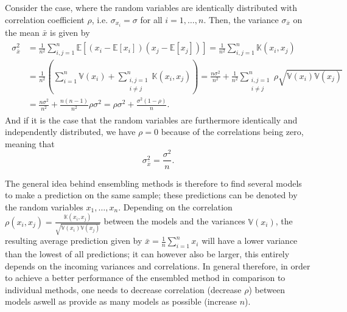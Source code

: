 \documentclass[a4paper,11pt]{article}
\numberwithin{equation}{section}
\begin{document}
{Consider the case, where the random variables are identically distributed with correlation coefficient $\rho$, i.e. $\sigma_{x_i} = \sigma$ for all $i=1,\dots,n$. Then, the variance $\sigma_{\bar{x}}$ on the mean $\bar{x}$ is given by \begin{align}\begin{aligned}
	\sigma_{\bar{x}}^2 &=\frac{1}{n^2}\sum_{i,j=1}^{n}\mathbb{E}\left[(x_i-\mathbb{E}[x_i])(x_j-\mathbb{E}[x_j])\right] = \frac{1}{n^2}\sum_{i,j=1}^{n}\mathbb{K}(x_i,x_j) \\ &= \frac{1}{n^2}\left(\sum_{i=1}^{n}\mathbb{V}(x_i)+\sum_{\substack{i,j=1 \\ i\neq j}}^{n}\mathbb{K}(x_i,x_j)\right) = \frac{n\sigma^2}{n^2}+ \frac{1}{n^2}\sum_{\substack{i,j=1 \\ i\neq j}}^{n}\rho \sqrt{\mathbb{V}(x_i)\mathbb{V}(x_j)} \\ &= \frac{n\sigma^2}{n^2} + \frac{n(n-1)}{n^2}\rho\sigma^2 = \rho\sigma^2 + \frac{\sigma^2(1-\rho)}{n}.
\end{aligned}\end{align} And if it is the case that the random variables are furthermore identically and independently distributed, we have $\rho=0$ because of the correlations being zero, meaning that \begin{equation}
\sigma_{\bar{x}}^2 = \frac{\sigma^2}{n}.
\end{equation}

The general idea behind ensembling methods is therefore to find several models to make a prediction on the same sample; these predictions can be denoted by the random variables $x_1,\dots,x_n$. Depending on the correlation $\rho(x_i,x_j)=\frac{\mathbb{K}(x_i,x_j)}{\sqrt{\mathbb{V}(x_i)\mathbb{V}(x_j)}}$ between the models and the variances $\mathbb{V}(x_i)$, the resulting average prediction given by $\bar{x} = \frac{1}{n}\sum_{i=1}^nx_i$ will have a lower variance than the lowest of all predictions; it can however also be larger, this entirely depends on the incoming variances and correlations. In general therefore, in order to achieve a better performance of the ensembled method in comparison to individual methods, one needs to decrease correlation (decrease $\rho$) between models aswell as provide as many models as possible (increase $n$).
}
\end{document}
